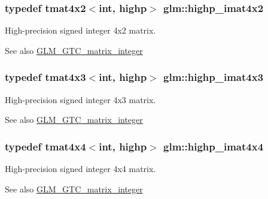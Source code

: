 \subsubsection[{highp\+\_\+imat4x2}]{\setlength{\rightskip}{0pt plus 5cm}typedef tmat4x2$<$int, highp$>$ {\bf glm\+::highp\+\_\+imat4x2}}\label{group__gtc__matrix__integer_ga7b936ac315e12b546d2597a4bffee4a1}
High-\/precision signed integer 4x2 matrix. \begin{DoxySeeAlso}{See also}
\hyperlink{group__gtc__matrix__integer}{G\+L\+M\+\_\+\+G\+T\+C\+\_\+matrix\+\_\+integer} 
\end{DoxySeeAlso}
\hypertarget{group__gtc__matrix__integer_ga28e21d3fe05d8476402e27081150cade}{}
\subsubsection[{highp\+\_\+imat4x3}]{\setlength{\rightskip}{0pt plus 5cm}typedef tmat4x3$<$int, highp$>$ {\bf glm\+::highp\+\_\+imat4x3}}\label{group__gtc__matrix__integer_ga28e21d3fe05d8476402e27081150cade}
High-\/precision signed integer 4x3 matrix. \begin{DoxySeeAlso}{See also}
\hyperlink{group__gtc__matrix__integer}{G\+L\+M\+\_\+\+G\+T\+C\+\_\+matrix\+\_\+integer} 
\end{DoxySeeAlso}
\hypertarget{group__gtc__matrix__integer_ga2a80b8ab686297145ecf713699233114}{}
\subsubsection[{highp\+\_\+imat4x4}]{\setlength{\rightskip}{0pt plus 5cm}typedef tmat4x4$<$int, highp$>$ {\bf glm\+::highp\+\_\+imat4x4}}\label{group__gtc__matrix__integer_ga2a80b8ab686297145ecf713699233114}
High-\/precision signed integer 4x4 matrix. \begin{DoxySeeAlso}{See also}
\hyperlink{group__gtc__matrix__integer}{G\+L\+M\+\_\+\+G\+T\+C\+\_\+matrix\+\_\+integer} 
\end{DoxySeeAlso}
\hypertarget{group__gtc__matrix__integer_ga113fe97aa8688eaa287a02f8362f3e47}{}
